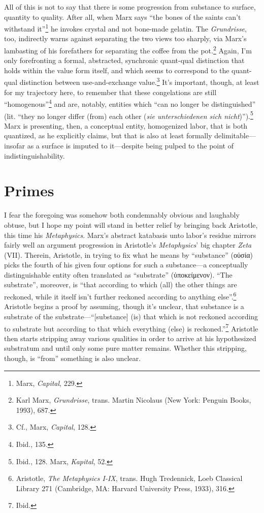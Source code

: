 \documentclass[12pt]{article}
\begin{document}
All of this is not to say that there is some progression from substance to surface, quantity to quality. After all, when Marx says ``the bones of the saints can't withstand it''\footnote{Marx, \textit{Capital}, 229.} he invokes crystal and not bone-made gelatin. The \textit{Grundrisse}, too, indirectly warns against separating the two views too sharply, via Marx's lambasting of his forefathers for separating the coffee from the pot.\footnote{Karl Marx, \textit{Grundrisse}, trans. Martin Nicolaus (New York: Penguin Books, 1993), 687.} Again, I'm only forefronting a formal, abstracted, synchronic quant-qual distinction that holds within the value form itself, and which seems to correspond to the quant-qual distinction between use-and-exchange value.\footnote{Cf., Marx, \textit{Capital}, 128.} It's important, though, at least for my trajectory here, to remember that these congelations are still ``homogenous''\footnote{Ibid., 135.} and are, notably, entities which ``can no longer be distinguished'' (lit. ``they no longer differ (from) each other (\textit{sie unterschiedenen sich nicht})'').\footnote{Ibid., 128. Marx, \textit{Kapital}, 52.} Marx is presenting, then, a conceptual entity, homogenized labor, that is both quantized, as he explicitly claims, but that is also at least formally delimitable---insofar as a surface is imputed to it---despite being pulped to the point of indistinguishability.

\section{Primes}
I fear the foregoing was somehow both condemnably obvious and laughably obtuse, but I hope my point will stand in better relief by bringing back Aristotle, this time his \textit{Metaphysics}. Marx's abstract katabasis unto labor's residue mirrors fairly well an argument progression in Aristotle's \textit{Metaphysics}' big chapter \textit{Zeta} (VII). Therein, Aristotle, in trying to fix what he means by ``substance'' (οὐσία) picks the fourth of his given four options for such a substance---a conceptually distinguishable entity often translated as ``substrate'' (ὑποκείμενον). ``The substrate'', moreover, is ``that according to which (all) the other things are reckoned, while it itself isn't further reckoned according to anything else''.\footnote{Aristotle, \textit{The Metaphysics I-IX}, trans. Hugh Tredennick, Loeb Classical Library 271 (Cambridge, MA: Harvard University Press, 1933), 316.} Aristotle begins a proof by assuming, though it's unclear, that substance is a substrate of the substrate---``[substance] (is) that which is not reckoned according to substrate but according to that which everything (else) is reckoned.''\footnote{Ibid.} Aristotle then starts stripping away various qualities in order to arrive at his hypothesized substratum and until only some pure matter remains. Whether this stripping, though, is ``from'' something is also unclear.  
\end{document}
